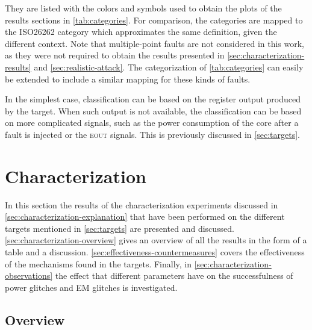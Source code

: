\documentclass[10pt]{article}
\newcommand{\errorpin}{\textsc{eout}\xspace}
\begin{document}
      \noindent They are listed with the colors and symbols used to obtain the plots of the results sections in \autoref{tab:categories}. For comparison, the categories are mapped to the ISO26262 category which approximates the same definition, given the different context. Note that multiple-point faults are not considered in this work, as they were not required to obtain the results presented in \autoref{sec:characterization-results} and \autoref{sec:realistic-attack}. The categorization of \autoref{tab:categories} can easily be extended to include a similar mapping for these kinds of faults.

      In the simplest case, classification can be based on the register output produced by the target. When such output is not available, the classification can be based on more complicated signals, such as the power consumption of the core after a fault is injected or the \errorpin signals. This is previously discussed in \autoref{sec:targets}.

\newpage
\section{Characterization }
\label{sec:characterization-results}

  In this section the results of the characterization experiments discussed in \autoref{sec:characterization-explanation} that have been performed on the different targets mentioned in \autoref{sec:targets} are presented and discussed. \autoref{sec:characterization-overview} gives an overview of all the results in the form of a table and a discussion. \autoref{sec:effectiveness-countermeasures} covers the effectiveness of the mechanisms found in the targets. Finally, in \autoref{sec:characterization-observations} the effect that different parameters have on the successfulness of power glitches and EM glitches is investigated. 

  \subsection{Overview }
  \label{sec:characterization-overview}
\end{document}

